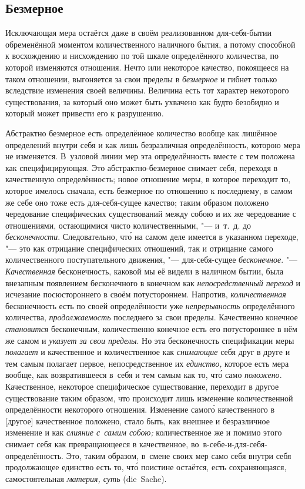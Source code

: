 \subsection{Безмерное}

Исключающая мера остаётся даже в своём реализованном для-себя-бытии
обременённой моментом количественного наличного бытия, а потому способной к
восхождению и нисхождению по той шкале определённого количества, по которой
изменяются отношения. Нечто или некоторое качество, покоящееся на таком
отношении, выгоняется за свои пределы в {\em безмерное} и гибнет только
вследствие изменения своей величины. Величина есть тот характер некоторого
существования, за который оно может быть ухвачено как будто безобидно и который
может привести его к разрушению.

Абстрактно безмерное есть определённое количество вообще как лишённое
определений внутри себя и как лишь безразличная определённость, которою мера не
изменяется. В~узловой линии мер эта определённость вместе с тем положена как
специфицирующая. Это абстрактно-безмерное снимает себя, переходя в качественную
определённость; новое отношение меры, в которое переходит то, которое имелось
сначала, есть безмерное по отношению к последнему, в самом же себе оно тоже
есть для-себя-сущее качество; таким образом положено чередование специфических
существований между собою и их же чередование с отношениями, остающимися чисто
количественными, "--- и~т.~д. до {\em бесконечности}. Следовательно, чт\'{о} на
самом деле имеется в указанном переходе, "--- это как отрицание специфических
отношений, так и отрицание самого количественного поступательного движения,
"--- для-себя-сущее {\em бесконечное}. "--- {\em Качественная} бесконечность,
каковой мы её видели в наличном бытии, была внезапным появлением бесконечного в
конечном как {\em непосредственный переход} и исчезание посюстороннего в своём
потустороннем. Напротив, {\em количественная} бесконечность есть по своей
определённости уже {\em непрерывность} определённого количества,
{\em продолжаемость} последнего за свои пределы. Качественно конечное
{\em становится} бесконечным, количественно конечное есть его потустороннее в
нём же самом и {\em указует за свои пределы}. Но эта бесконечность спецификации
меры {\em полагает} и качественное и количественное как {\em снимающие} себя
друг в друге и тем самым полагает первое, непосредственное их {\em единство,}
которое есть мера вообще, как возвратившееся в~себя и тем самым как то, чт\'{о}
само {\em положено}. Качественное, некоторое специфическое существование,
переходит в другое существование таким образом, что происходит лишь изменение
количественной определённости некоторого отношения. Изменение самог\'{о}
качественного в [другое] качественное положено, стало быть, как внешнее и
безразличное изменение и как {\em слияние с~самим собою;} количественное же и
помимо этого снимает себя как превращающееся в качественное,
во~в-себе-и-для-себя-определённость. Это, таким образом, в~смене своих мер само
себя внутри себя продолжающее единство есть то, чт\'{о} поистине остаётся, есть
сохраняющаяся, самостоятельная {\em материя, суть} (die~Sache).

